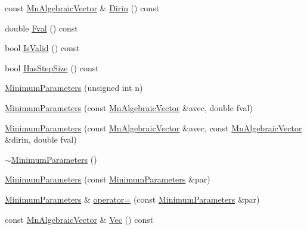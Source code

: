 \begin{DoxyCompactItemize}
\item 
const \mbox{\hyperlink{namespaceROOT_1_1Minuit2_a62ed97730a1ca8d3fbaec64a19aa11c9}{Mn\+Algebraic\+Vector}} \& \mbox{\hyperlink{classROOT_1_1Minuit2_1_1MinimumParameters_a2c5c5f0add9ecbdf6b5d4ff962d68d15}{Dirin}} () const
\item 
double \mbox{\hyperlink{classROOT_1_1Minuit2_1_1MinimumParameters_a1f9cd63f5947771e367bedd4dafa54e3}{Fval}} () const
\item 
bool \mbox{\hyperlink{classROOT_1_1Minuit2_1_1MinimumParameters_a4b30eb313781bc8e344efa322461952a}{Is\+Valid}} () const
\item 
bool \mbox{\hyperlink{classROOT_1_1Minuit2_1_1MinimumParameters_a5533f870590176dbcf5b3e04e6470fd9}{Has\+Step\+Size}} () const
\item 
\mbox{\hyperlink{classROOT_1_1Minuit2_1_1MinimumParameters_aa6d319726e98ab129fea9d93268a21da}{Minimum\+Parameters}} (unsigned int n)
\item 
\mbox{\hyperlink{classROOT_1_1Minuit2_1_1MinimumParameters_a72fd528946a07bcf3e320c0505953aa8}{Minimum\+Parameters}} (const \mbox{\hyperlink{namespaceROOT_1_1Minuit2_a62ed97730a1ca8d3fbaec64a19aa11c9}{Mn\+Algebraic\+Vector}} \&avec, double fval)
\item 
\mbox{\hyperlink{classROOT_1_1Minuit2_1_1MinimumParameters_ad771c737e802f1f6a6f01b94dd249ef7}{Minimum\+Parameters}} (const \mbox{\hyperlink{namespaceROOT_1_1Minuit2_a62ed97730a1ca8d3fbaec64a19aa11c9}{Mn\+Algebraic\+Vector}} \&avec, const \mbox{\hyperlink{namespaceROOT_1_1Minuit2_a62ed97730a1ca8d3fbaec64a19aa11c9}{Mn\+Algebraic\+Vector}} \&dirin, double fval)
\item 
\mbox{\hyperlink{classROOT_1_1Minuit2_1_1MinimumParameters_a1e7d7b8ed914bec0a2e4f68642b9a377}{$\sim$\+Minimum\+Parameters}} ()
\item 
\mbox{\hyperlink{classROOT_1_1Minuit2_1_1MinimumParameters_a5cea4660328847c3eb5ebc48041acc4c}{Minimum\+Parameters}} (const \mbox{\hyperlink{classROOT_1_1Minuit2_1_1MinimumParameters}{Minimum\+Parameters}} \&par)
\item 
\mbox{\hyperlink{classROOT_1_1Minuit2_1_1MinimumParameters}{Minimum\+Parameters}} \& \mbox{\hyperlink{classROOT_1_1Minuit2_1_1MinimumParameters_a60b35f7b9d6b7e49d2573581a3a9f081}{operator=}} (const \mbox{\hyperlink{classROOT_1_1Minuit2_1_1MinimumParameters}{Minimum\+Parameters}} \&par)
\item 
const \mbox{\hyperlink{namespaceROOT_1_1Minuit2_a62ed97730a1ca8d3fbaec64a19aa11c9}{Mn\+Algebraic\+Vector}} \& \mbox{\hyperlink{classROOT_1_1Minuit2_1_1MinimumParameters_ad93c17d14f4ddbc66c91107ff3a80dbe}{Vec}} () const

\end{DoxyCompactItemize}
